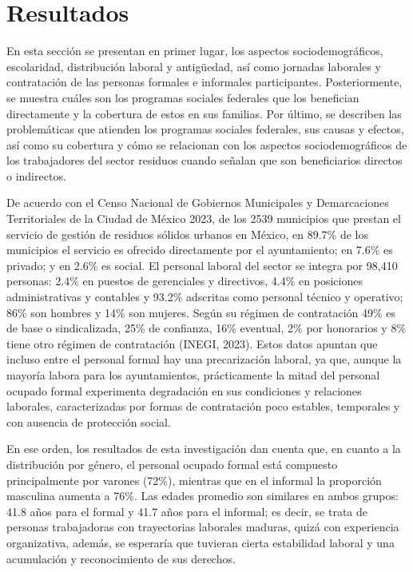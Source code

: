 \documentclass[
  spanish,
  11.5pt,
  170mm x 240mmpaper,
]{scrbook}
\begin{document}

\chapter{Resultados}\label{resultados}

En esta sección se presentan en primer lugar, los aspectos
sociodemográficos, escolaridad, distribución laboral y antigüedad, así
como jornadas laborales y contratación de las personas formales e
informales participantes. Posteriormente, se muestra cuáles son los
programas sociales federales que los benefician directamente y la
cobertura de estos en sus familias. Por último, se describen las
problemáticas que atienden los programas sociales federales, sus causas
y efectos, así como su cobertura y cómo se relacionan con los aspectos
sociodemográficos de los trabajadores del sector residuos cuando señalan
que son beneficiarios directos o indirectos.

De acuerdo con el Censo Nacional de Gobiernos Municipales y
Demarcaciones Territoriales de la Ciudad de México 2023, de los 2539
municipios que prestan el servicio de gestión de residuos sólidos
urbanos en México, en 89.7\% de los municipios el servicio es ofrecido
directamente por el ayuntamiento; en 7.6\% es privado; y en 2.6\% es
social. El personal laboral del sector se integra por 98,410 personas:
2.4\% en puestos de gerenciales y directivos, 4.4\% en posiciones
administrativas y contables y 93.2\% adscritas como personal técnico y
operativo; 86\% son hombres y 14\% son mujeres. Según su régimen de
contratación 49\% es de base o sindicalizada, 25\% de confianza, 16\%
eventual, 2\% por honorarios y 8\% tiene otro régimen de contratación
(INEGI, 2023). Estos datos apuntan que incluso entre el personal formal
hay una precarización laboral, ya que, aunque la mayoría labora para los
ayuntamientos, prácticamente la mitad del personal ocupado formal
experimenta degradación en sus condiciones y relaciones laborales,
caracterizadas por formas de contratación poco estables, temporales y
con ausencia de protección social.

En ese orden, los resultados de esta investigación dan cuenta que, en
cuanto a la distribución por género, el personal ocupado formal está
compuesto principalmente por varones (72\%), mientras que en el informal
la proporción masculina aumenta a 76\%. Las edades promedio son
similares en ambos grupos: 41.8 años para el formal y 41.7 años para el
informal; es decir, se trata de personas trabajadoras con trayectorias
laborales maduras, quizá con experiencia organizativa, además, se
esperaría que tuvieran cierta estabilidad laboral y una acumulación y
reconocimiento de sus derechos.
\end{document}
